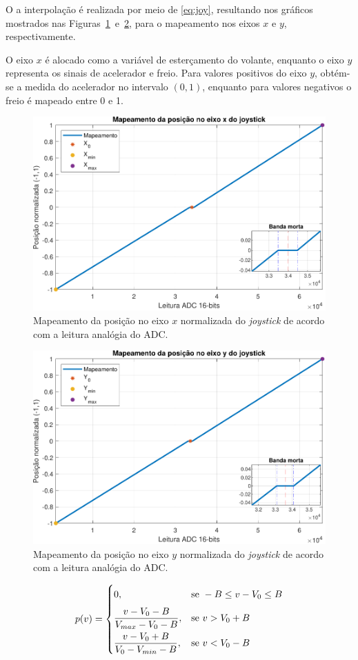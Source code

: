 O a interpolação é realizada por meio de \eqref{eq:joy}, resultando nos gráficos mostrados nas Figuras~\ref{fig:plotjoyxaxis}~e~\ref{fig:plotjoyyaxis}, para o mapeamento nos eixos $x$ e $y$, respectivamente.

O eixo $x$ é alocado como a variável de esterçamento do volante, enquanto o eixo $y$ representa os sinais de acelerador e freio. Para valores positivos do eixo $y$, obtém-se a medida do acelerador no intervalo $(0,1)$, enquanto para valores negativos o freio é mapeado entre 0 e 1.

\begin{figure}
	\centering
	\includegraphics[width=0.75\linewidth]{img/plot_joy_x_axis.pdf}
	\caption{Mapeamento da posição no eixo $x$ normalizada do \textit{joystick} de acordo com a leitura analógia do ADC.}
	\label{fig:plotjoyxaxis}
\end{figure}

\begin{figure}
\centering
\includegraphics[width=0.75\linewidth]{img/plot_joy_y_axis.pdf}
\caption{Mapeamento da posição no eixo $y$ normalizada do \textit{joystick} de acordo com a leitura analógia do ADC.}
\label{fig:plotjoyyaxis}
\end{figure}

\begin{equation}\label{eq:joy}
	p(v) = \begin{dcases}
		0\vphantom{\frac{0}{0}}, &\text{se } - B \le v - V_0 \le B \\
		\frac{v - V_0 - B}{V_{max} - V_0 - B}, &\text{se } v > V_0 + B \\
		\frac{v - V_0 + B}{V_0 - V_{min} - B}, &\text{se } v < V_0 - B 
	\end{dcases}
\end{equation}

